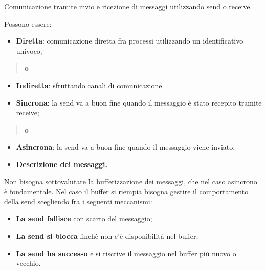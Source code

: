 Comunicazione tramite invio e ricezione di messaggi utilizzando send o
receive.

Possono essere:

\begin{itemize}
\item
  \textbf{Diretta}: comunicazione diretta fra processi utilizzando un
  identificativo univoco;
\end{itemize}

\begin{quote}
\textbf{o}
\end{quote}

\begin{itemize}
\item
  \textbf{Indiretta}: sfruttando canali di comunicazione.
\end{itemize}

\begin{itemize}
\item
  \textbf{Sincrona}: la send va a buon fine quando il messaggio è stato
  recepito tramite receive;
\end{itemize}

\begin{quote}
\textbf{o}
\end{quote}

\begin{itemize}
\item
  \textbf{Asincrona}: la send va a buon fine quando il messaggio viene
  inviato.
\end{itemize}

\begin{itemize}
\item
  \textbf{Descrizione dei messaggi.}
\end{itemize}

Non bisogna sottovalutare la bufferizzazione dei messaggi, che nel caso
asincrono è fondamentale. Nel caso il buffer si riempia bisogna gestire
il comportamento della send scegliendo fra i seguenti meccanismi:

\begin{itemize}
\item
  \textbf{La send fallisce} con scarto del messaggio;
\item
  \textbf{La send si blocca} finchè non c'è disponibilità nel buffer;
\item
  \textbf{La send ha successo} e si riscrive il messaggio nel buffer più
  nuovo o vecchio.
\end{itemize}

